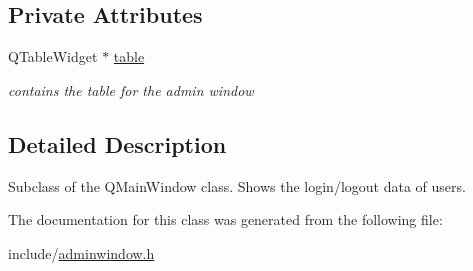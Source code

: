 \subsection*{Private Attributes}
\begin{DoxyCompactItemize}
\item 
\mbox{\label{classAdminWindow_aa7e56cebeaeca9a3d9cf05df2f1c0f3f}} 
Q\+Table\+Widget $\ast$ \hyperlink{classAdminWindow_aa7e56cebeaeca9a3d9cf05df2f1c0f3f}{table}
\begin{DoxyCompactList}\small\item\em contains the table for the admin window \end{DoxyCompactList}\end{DoxyCompactItemize}


\subsection{Detailed Description}
Subclass of the Q\+Main\+Window class. Shows the login/logout data of users. 

The documentation for this class was generated from the following file\+:\begin{DoxyCompactItemize}
\item 
include/\hyperlink{adminwindow_8h}{adminwindow.\+h}\end{DoxyCompactItemize}

